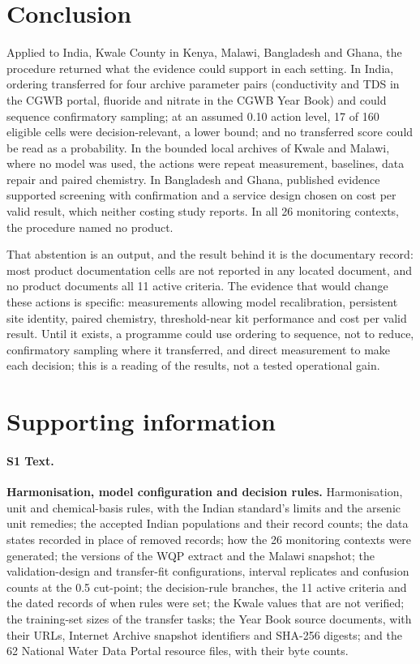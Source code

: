 \documentclass[10pt,letterpaper]{article}
\begin{document}
\section*{Conclusion}

Applied to India, Kwale County in Kenya, Malawi, Bangladesh and Ghana, the procedure returned what the evidence could support in each setting. In India, ordering transferred for four archive \texttimes{} parameter pairs (conductivity and TDS in the CGWB portal, fluoride and nitrate in the CGWB Year Book) and could sequence confirmatory sampling; at an assumed 0.10 action level, 17 of 160 eligible cells were decision-relevant, a lower bound; and no transferred score could be read as a probability. In the bounded local archives of Kwale and Malawi, where no model was used, the actions were repeat measurement, baselines, data repair and paired chemistry. In Bangladesh and Ghana, published evidence supported screening with confirmation and a service design chosen on cost per valid result, which neither costing study reports. In all 26 monitoring contexts, the procedure named no product.

That abstention is an output, and the result behind it is the documentary record: most product documentation cells are not reported in any located document, and no product documents all 11 active criteria. The evidence that would change these actions is specific: measurements allowing model recalibration, persistent site identity, paired chemistry, threshold-near kit performance and cost per valid result. Until it exists, a programme could use ordering to sequence, not to reduce, confirmatory sampling where it transferred, and direct measurement to make each decision; this is a reading of the results, not a tested operational gain.

\section*{Supporting information}

\paragraph*{S1 Text.}
\label{S1_Text}
\textbf{Harmonisation, model configuration and decision rules.} Harmonisation, unit and chemical-basis rules, with the Indian standard's limits and the arsenic unit remedies; the accepted Indian populations and their record counts; the data states recorded in place of removed records; how the 26 monitoring contexts were generated; the versions of the WQP extract and the Malawi snapshot; the validation-design and transfer-fit configurations, interval replicates and confusion counts at the 0.5 cut-point; the decision-rule branches, the 11 active criteria and the dated records of when rules were set; the Kwale values that are not verified; the training-set sizes of the transfer tasks; the Year Book source documents, with their URLs, Internet Archive snapshot identifiers and SHA-256 digests; and the 62 National Water Data Portal resource files, with their byte counts.
\end{document}
